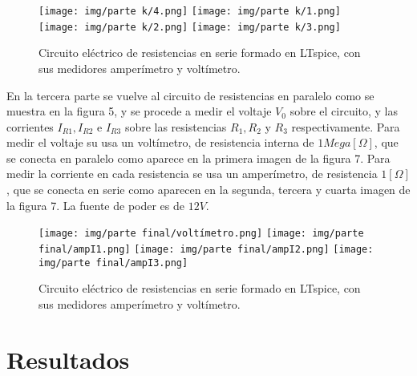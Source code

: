 \documentclass[letterpaper,11pt]{article} %
\begin{document}
\begin{figure}[H]
\caption{Circuito eléctrico de resistencias en serie formado en LTspice, con sus medidores amperímetro y voltímetro.}
\centering
\texttt{[image: img/parte k/4.png]}
\texttt{[image: img/parte k/1.png]}
\texttt{[image: img/parte k/2.png]}
\texttt{[image: img/parte k/3.png]}
\end{figure}
En la tercera parte se vuelve al circuito de resistencias en paralelo como se muestra en la figura 5, y se procede a medir el voltaje $V_0$ sobre el circuito, y las corrientes $I_{R1},I_{R2}$ e $I_{R3}$ sobre las resistencias $R_1, R_2$ y $R_3$ respectivamente.
Para medir el voltaje su usa un voltímetro, de resistencia interna de $1 Mega [\Omega]$, que se conecta en paralelo como aparece en la primera imagen de la figura 7. Para medir la corriente en cada resistencia se usa un amperímetro, de resistencia $1[\Omega]$, que se conecta en serie  como aparecen en la segunda, tercera y cuarta imagen de la figura 7. La fuente de poder es de $12 V$. 

\begin{figure}[H]
\caption{Circuito eléctrico de resistencias en serie formado en LTspice, con sus medidores  amperímetro y voltímetro.}
\centering
\texttt{[image: img/parte final/voltímetro.png]}
\texttt{[image: img/parte final/ampI1.png]}
\texttt{[image: img/parte final/ampI2.png]}
\texttt{[image: img/parte final/ampI3.png]}
\end{figure}
\newpage 
\section{Resultados}
\end{document}
